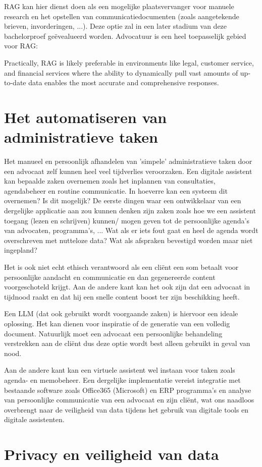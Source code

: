RAG kan hier dienst doen als een mogelijke plaatsvervanger voor manuele research en het opstellen van communicatiedocumenten (zoals aangetekende brieven, invorderingen, ...). Deze optie zal in
een later stadium van deze bachelorproef geëvealueerd worden. Advocatuur is een heel toepasselijk gebied voor RAG:

\begin{displayquote}
	Practically, RAG is likely preferable in environments like
	legal, customer service, and financial services where the ability to
	dynamically pull vast amounts of up-to-date data enables the most accurate and comprehensive responses.
\end{displayquote}

\section{Het automatiseren van administratieve taken}
Het manueel en persoonlijk afhandelen van 'simpele' administratieve taken door een advocaat zelf kunnen heel veel tijdverlies veroorzaken. Een digitale assistent kan bepaalde zaken
overnemen zoals het inplannen van consultaties, agendabeheer en routine communicatie. In hoeverre kan een systeem dit overnemen? Is dit mogelijk? 
De eerste dingen waar een ontwikkelaar van een dergelijke applicatie aan zou kunnen denken zijn zaken zoals hoe we een assistent toegang (lezen en schrijven) kunnen/ mogen geven tot 
de persoonlijke agenda's van advocaten, programma's, ... Wat als er iets fout gaat en heel de agenda wordt overschreven met nutteloze data? Wat als afspraken bevestigd worden maar niet ingepland? 

Het is ook niet echt ethisch verantwoord als een cliënt een som betaalt voor persoonlijke aandacht en communicatie en dan gegenereerde content voorgeschoteld krijgt. 
Aan de andere kant kan het ook zijn dat een advocaat in tijdnood raakt en dat hij een snelle content boost ter zijn beschikking heeft. 

Een LLM (dat ook gebruikt wordt voorgaande zaken) is hiervoor een ideale oplossing. Het kan dienen voor inspiratie of de generatie van een volledig document. Natuurlijk moet
een advocaat een persoonlijke behandeling verstrekken aan de cliënt dus deze optie wordt best alleen gebruikt in geval van nood. 

Aan de andere kant kan een virtuele assistent wel instaan voor taken zoals agenda- en memobeheer. 
Een dergelijke implementatie vereist integratie met bestaande software zoals Office365 (Microsoft) en ERP programma's en analyse van persoonlijke communicatie van een advocaat en zijn cliënt,
wat ons naadloos overbrengt naar de veiligheid van data tijdens het gebruik van digitale tools en digitale assistenten. 

\section{Privacy en veiligheid van data}

